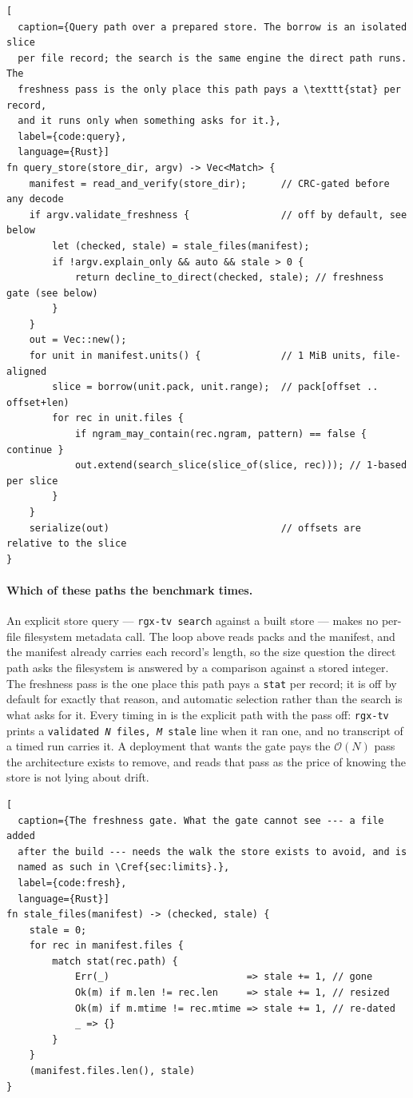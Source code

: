 \documentclass[11pt,letterpaper]{article}
\begin{document}
\begin{lstlisting}[
  caption={Query path over a prepared store. The borrow is an isolated slice
  per file record; the search is the same engine the direct path runs. The
  freshness pass is the only place this path pays a \texttt{stat} per record,
  and it runs only when something asks for it.},
  label={code:query},
  language={Rust}]
fn query_store(store_dir, argv) -> Vec<Match> {
    manifest = read_and_verify(store_dir);      // CRC-gated before any decode
    if argv.validate_freshness {                // off by default, see below
        let (checked, stale) = stale_files(manifest);
        if !argv.explain_only && auto && stale > 0 {
            return decline_to_direct(checked, stale); // freshness gate (see below)
        }
    }
    out = Vec::new();
    for unit in manifest.units() {              // 1 MiB units, file-aligned
        slice = borrow(unit.pack, unit.range);  // pack[offset .. offset+len)
        for rec in unit.files {
            if ngram_may_contain(rec.ngram, pattern) == false { continue }
            out.extend(search_slice(slice_of(slice, rec))); // 1-based per slice
        }
    }
    serialize(out)                              // offsets are relative to the slice
}
\end{lstlisting}

\paragraph{Which of these paths the benchmark times.}
An explicit store query --- \texttt{rgx-tv search} against a built store ---
makes no per-file filesystem metadata call. The loop above reads packs and the
manifest, and the manifest already carries each record's length, so the size
question the direct path asks the filesystem is answered by a comparison
against a stored integer. The freshness pass is the one place this path pays a
\texttt{stat} per record; it is off by default for exactly that reason, and
automatic selection rather than the search is what asks for it. Every timing in
 is the explicit path with the pass off: \texttt{rgx-tv} prints
a \texttt{validated \emph{N} files, \emph{M} stale} line when it ran one, and no
transcript of a timed run carries it. A deployment that wants the gate pays the
$\mathcal{O}(N)$ pass the architecture exists to remove, and reads that pass as
the price of knowing the store is not lying about drift.

\begin{lstlisting}[
  caption={The freshness gate. What the gate cannot see --- a file added
  after the build --- needs the walk the store exists to avoid, and is
  named as such in \Cref{sec:limits}.},
  label={code:fresh},
  language={Rust}]
fn stale_files(manifest) -> (checked, stale) {
    stale = 0;
    for rec in manifest.files {
        match stat(rec.path) {
            Err(_)                        => stale += 1, // gone
            Ok(m) if m.len != rec.len     => stale += 1, // resized
            Ok(m) if m.mtime != rec.mtime => stale += 1, // re-dated
            _ => {}
        }
    }
    (manifest.files.len(), stale)
}
\end{lstlisting}
\end{document}
